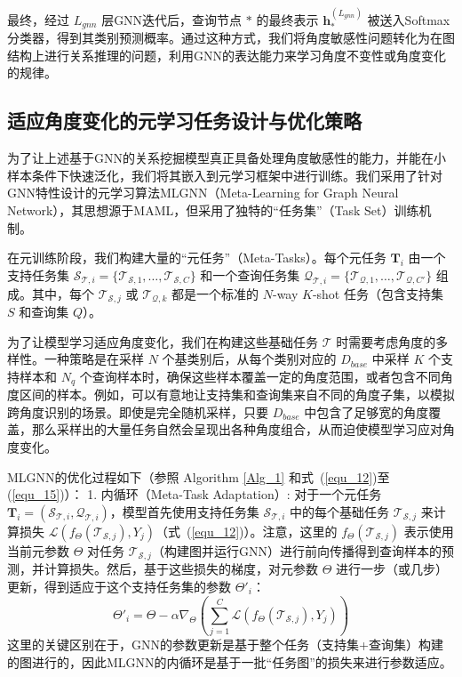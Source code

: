 最终，经过 $L_{gnn}$ 层GNN迭代后，查询节点 $*$ 的最终表示 $\mathbf{h}_*^{(L_{gnn})}$ 被送入Softmax分类器，得到其类别预测概率。通过这种方式，我们将角度敏感性问题转化为在图结构上进行关系推理的问题，利用GNN的表达能力来学习角度不变性或角度变化的规律。

\subsection{适应角度变化的元学习任务设计与优化策略}
\label{subsec:meta_learning_angle}

为了让上述基于GNN的关系挖掘模型真正具备处理角度敏感性的能力，并能在小样本条件下快速泛化，我们将其嵌入到元学习框架中进行训练。我们采用了针对GNN特性设计的元学习算法MLGNN（Meta-Learning for Graph Neural Network），其思想源于MAML，但采用了独特的“任务集”（Task Set）训练机制。

在元训练阶段，我们构建大量的“元任务”（Meta-Tasks）。每个元任务 $\mathbf{T}_i$ 由一个支持任务集 $\mathcal{S}_{\mathcal{T},i} = \{\mathcal{T}_{\mathcal{S},1}, \dots, \mathcal{T}_{\mathcal{S},C}\}$ 和一个查询任务集 $\mathcal{Q}_{\mathcal{T},i} = \{\mathcal{T}_{\mathcal{Q},1}, \dots, \mathcal{T}_{\mathcal{Q},C'}\}$ 组成。其中，每个 $\mathcal{T}_{\mathcal{S},j}$ 或 $\mathcal{T}_{\mathcal{Q},k}$ 都是一个标准的 $N$-way $K$-shot 任务（包含支持集 $S$ 和查询集 $Q$）。

为了让模型学习适应角度变化，我们在构建这些基础任务 $\mathcal{T}$ 时需要考虑角度的多样性。一种策略是在采样 $N$ 个基类别后，从每个类别对应的 $D_{base}$ 中采样 $K$ 个支持样本和 $N_q$ 个查询样本时，确保这些样本覆盖一定的角度范围，或者包含不同角度区间的样本。例如，可以有意地让支持集和查询集来自不同的角度子集，以模拟跨角度识别的场景。即使是完全随机采样，只要 $D_{base}$ 中包含了足够宽的角度覆盖，那么采样出的大量任务自然会呈现出各种角度组合，从而迫使模型学习应对角度变化。

MLGNN的优化过程如下（参照 Algorithm \ref{Alg_1} 和式~(\ref{equ_12})至(\ref{equ_15})）：
1.  内循环（Meta-Task Adaptation）: 对于一个元任务 $\mathbf{T}_i = (\mathcal{S}_{\mathcal{T},i}, \mathcal{Q}_{\mathcal{T},i})$，模型首先使用支持任务集 $\mathcal{S}_{\mathcal{T},i}$ 中的每个基础任务 $\mathcal{T}_{\mathcal{S},j}$ 来计算损失 $\mathcal{L}(f_{\Theta}(\mathcal{T}_{\mathcal{S},j}), Y_j)$（式~(\ref{equ_12})）。注意，这里的 $f_{\Theta}(\mathcal{T}_{\mathcal{S},j})$ 表示使用当前元参数 $\Theta$ 对任务 $\mathcal{T}_{\mathcal{S},j}$（构建图并运行GNN）进行前向传播得到查询样本的预测，并计算损失。然后，基于这些损失的梯度，对元参数 $\Theta$ 进行一步（或几步）更新，得到适应于这个支持任务集的参数 $\Theta'_i$：
    \begin{equation}
        \Theta'_{i} = \Theta - \alpha \nabla_{\Theta} \left( \sum_{j=1}^C \mathcal{L}(f_{\Theta}(\mathcal{T}_{\mathcal{S},j}), Y_j) \right)
        \label{eq:mlgnn_inner_update}
    \end{equation}
    这里的关键区别在于，GNN的参数更新是基于整个任务（支持集+查询集）构建的图进行的，因此MLGNN的内循环是基于一批“任务图”的损失来进行参数适应。

